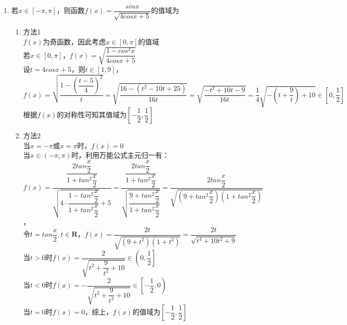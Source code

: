 \begin{enumerate}
\begin{enumerate}
\begin{enumerate}
            \item 若$x \in [-\pi, \pi]$，则函数$f(x) = \dfrac{sinx}{\sqrt{4cosx + 5}}$的值域为
            \begin{jieda}
                \begin{enumerate}
                    \item 方法1 \\
                        $f(x)$为奇函数，因此考虑$x \in [0, \pi]$的值域 \\
                        若$x \in [0, \pi]$，$f(x) = \sqrt{\dfrac{1-cos^2x}{4cosx+5}}$ \\
                        设$t = 4cosx+5$，则$t \in [1, 9]$，$f(x) = \sqrt{\dfrac{1-\left(\dfrac{t-5}{4}\right)^2}{t}} = \sqrt{\dfrac{16 - (t^2-10t+25)}{16t}} = \sqrt{\dfrac{-t^2+10t-9}{16t}} = \dfrac{1}{4}\sqrt{-(t+\dfrac{9}{t})+10} \in \left[0, \dfrac{1}{2}\right]$ \\
                        根据$f(x)$的对称性可知其值域为$\left[-\dfrac{1}{2}, \dfrac{1}{2}\right]$
                    \item 方法2 \\
                        当$x = -\pi$或$x = \pi$时，$f(x) = 0$ \\
                        当$x \in (-\pi, \pi)$时，利用万能公式主元归一有：\\
                        $f(x) = \dfrac{\dfrac{2tan\dfrac{x}{2}}{1+tan^2\dfrac{x}{2}}}{\sqrt{4 \cdot \dfrac{1-tan^2\dfrac{x}{2}}{1+tan^2\dfrac{x}{2}}} + 5} = \dfrac{\dfrac{2tan\dfrac{x}{2}}{1+tan^2\dfrac{x}{2}}}{\sqrt{\dfrac{9+tan^2\dfrac{x}{2}}{1+tan^2\dfrac{x}{2}}}}  = \dfrac{2tan\dfrac{x}{2}}{\sqrt{(9+tan^2\dfrac{x}{2})(1+tan^2\dfrac{x}{2})}}$，\\
                        令$t = tan\dfrac{x}{2}, t \in \mathbf{R}$，$f(x) = \dfrac{2t}{\sqrt{(9+t^2)(1+t^2)}} = \dfrac{2t}{\sqrt{t^4+10t^2+9}}$ \\
                        当$t > 0$时$f(x) = \dfrac{2}{\sqrt{t^2 + \dfrac{9}{t^2} + 10}} \in \left(0, \dfrac{1}{2}\right]$ \\
                        当$t < 0$时$f(x) = -\dfrac{2}{\sqrt{t^2 + \dfrac{9}{t^2} + 10}} \in \left[-\dfrac{1}{2}, 0\right)$ \\
                        当$t = 0$时$f(x) = 0$，综上，$f(x)$的值域为$\left[-\dfrac{1}{2}, \dfrac{1}{2}\right]$
                \end{enumerate}
            \end{jieda}
        \end{enumerate}

\end{enumerate}
\end{enumerate}
